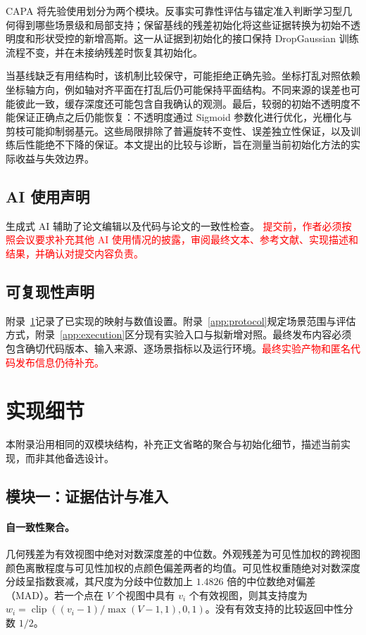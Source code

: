 \documentclass{article}
\newcommand{\ours}{CAPA}
\newcommand{\PH}[1]{\textcolor{red}{#1}}
\DeclareMathOperator{\clip}{clip}
\begin{document}
\ours{} 将先验使用划分为两个模块。反事实可靠性评估与锚定准入判断学习型几何得到哪些场景级和局部支持；保留基线的残差初始化将这些证据转换为初始不透明度和形状受控的新增高斯。这一从证据到初始化的接口保持 DropGaussian 训练流程不变，并在未接纳残差时恢复其初始化。

当基线缺乏有用结构时，该机制比较保守，可能拒绝正确先验。坐标打乱对照依赖坐标轴方向，例如轴对齐平面在打乱后仍可能保持平面结构。不同来源的误差也可能彼此一致，缓存深度还可能包含自我确认的观测。最后，较弱的初始不透明度不能保证正确点之后仍能恢复：不透明度通过 Sigmoid 参数化进行优化，光栅化与剪枝可能抑制弱基元。这些局限排除了普遍旋转不变性、误差独立性保证，以及训练后性能绝不下降的保证。本文提出的比较与诊断，旨在测量当前初始化方法的实际收益与失效边界。

\subsection*{AI 使用声明}
生成式 AI 辅助了论文编辑以及代码与论文的一致性检查。
\PH{提交前，作者必须按照会议要求补充其他 AI 使用情况的披露，审阅最终文本、参考文献、实现描述和结果，并确认对提交内容负责。}

\subsection*{可复现性声明}
附录~\ref{app:details}记录了已实现的映射与数值设置。附录~\ref{app:protocol}规定场景范围与评估方式，附录~\ref{app:execution}区分现有实验入口与拟新增对照。最终发布内容必须包含确切代码版本、输入来源、逐场景指标以及运行环境。\PH{最终实验产物和匿名代码发布信息仍待补充。}




\clearpage
\appendix
\section{实现细节}
\label{app:details}

本附录沿用相同的双模块结构，补充正文省略的聚合与初始化细节，描述当前实现，而非其他备选设计。

\subsection{模块一：证据估计与准入}
\label{app:admission}

\paragraph{自一致性聚合。}
几何残差为有效视图中绝对对数深度差的中位数。外观残差为可见性加权的跨视图颜色离散程度与可见性加权的点颜色偏差两者的均值。可见性权重随绝对对数深度分歧呈指数衰减，其尺度为分歧中位数加上 $1.4826$ 倍的中位数绝对偏差（MAD）。若一个点在 $V$ 个视图中具有 $v_i$ 个有效视图，则其支持度为 $w_i=\clip((v_i-1)/\max(V-1,1),0,1)$。没有有效支持的比较返回中性分数 $1/2$。
\end{document}
